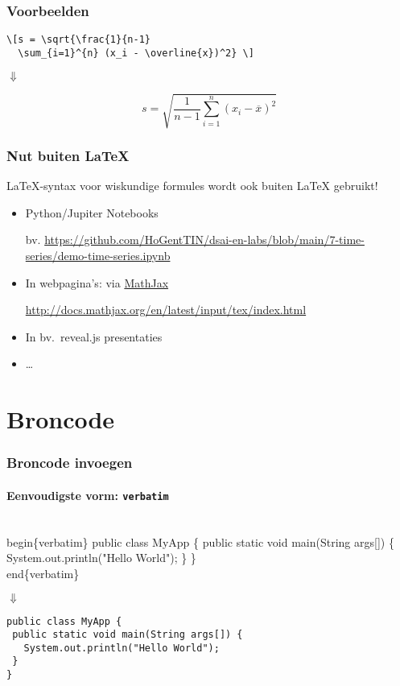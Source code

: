 \documentclass[aspectratio=169]{beamer}
\begin{document}
\begin{frame}[fragile]
  \frametitle{Voorbeelden}

  \begin{verbatim}
\[s = \sqrt{\frac{1}{n-1} 
  \sum_{i=1}^{n} (x_i - \overline{x})^2} \]
\end{verbatim}

  \bigskip

  \centering
  $\Downarrow$

  \bigskip

  \[s = \sqrt{\frac{1}{n-1} \sum_{i=1}^{n} (x_i - \overline{x})^2} \]

\end{frame}

\begin{frame}
  \frametitle{Nut buiten {\LaTeX}}

  {\LaTeX}-syntax voor wiskundige formules wordt ook buiten {\LaTeX} gebruikt!

  \begin{itemize}
    \item Python/Jupiter Notebooks

          bv. \url{https://github.com/HoGentTIN/dsai-en-labs/blob/main/7-time-series/demo-time-series.ipynb}

    \item In webpagina's: via \href{https://www.mathjax.org}{MathJax}

          \url{http://docs.mathjax.org/en/latest/input/tex/index.html}

    \item In bv.~reveal.js presentaties
    \item \ldots
  \end{itemize}

\end{frame}

\section{Broncode}

\begin{frame}[fragile]
  \frametitle{Broncode invoegen}
  \framesubtitle{Eenvoudigste vorm: \texttt{verbatim}}

\begin{semiverbatim}
\alert{\\begin\{verbatim\}}
public class MyApp \{
  public static void main(String args[]) \{
    System.out.println("Hello World");
  \}
\}
\alert{\\end\{verbatim\}}
\end{semiverbatim}

  \centering
  $\Downarrow$

\begin{verbatim}
public class MyApp {
 public static void main(String args[]) {
   System.out.println("Hello World");
 }
}
\end{verbatim}

\end{frame}
\end{document}
